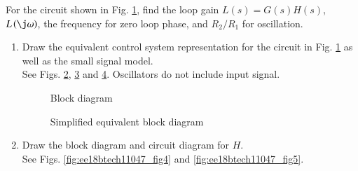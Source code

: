 For the circuit shown in Fig. \ref{fig:ee18btech11047_fig1}, find the loop gain $L(s) = G(s)H(s)$, $L\brak{\j\omega}$, the frequency for zero loop phase, and $R_{2}/R_{1}$ for oscillation.
\begin{enumerate}[label=\arabic*.,ref=\theenumi]

\item Draw the equivalent control system representation for the circuit in Fig. \ref{fig:ee18btech11047_fig1} as well as the small signal model. 
\\
\solution See Figs. \ref{fig:ee18btech11047_block}, \ref{fig:ee18btech11047_fig2} and \ref{fig:ee18btech11047_fig3}. Oscillators do not include input signal.
%
\renewcommand{\thefigure}{\theenumi.\arabic{figure}}
%
\begin{figure}[!ht]
	\begin{center}
		\resizebox{\columnwidth}{!}{}
	\end{center}
\caption{}
\label{fig:ee18btech11047_fig1}
\end{figure}
%
\begin{figure}[!ht]
	\begin{center}
		\resizebox{\columnwidth}{!}{}
	\end{center}
\caption{Block diagram}
\label{fig:ee18btech11047_block}
\end{figure}
\begin{figure}[!ht]
	\begin{center}
		\resizebox{\columnwidth}{!}{}
	\end{center}
\caption{Simplified equivalent block diagram}
\label{fig:ee18btech11047_fig2}
\end{figure}
%
\begin{figure}[!ht]
	\begin{center}
		\resizebox{\columnwidth}{!}{}
	\end{center}
\caption{}
\label{fig:ee18btech11047_fig3}
\end{figure}
\renewcommand{\thefigure}{\theenumi}
%
\item Draw the block diagram and circuit diagram for $H$.\\
\solution See Figs. \ref{fig:ee18btech11047_fig4} and \ref{fig:ee18btech11047_fig5}. 

\end{enumerate}
